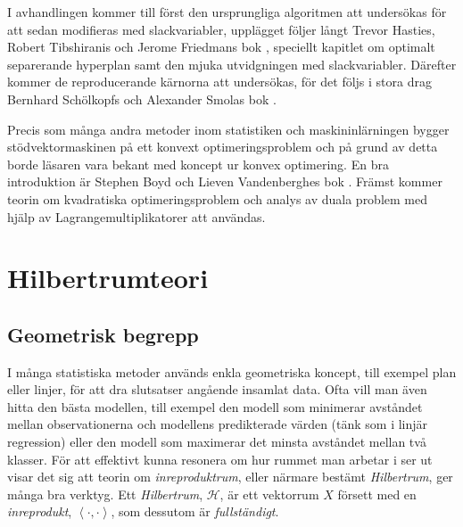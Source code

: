 \documentclass[a4paper, 12pt]{report}
\theoremstyle{definition}
\theoremstyle{remark}
\newcommand{\llangle}{\left\langle}
\newcommand{\rrangle}{\right\rangle}
\begin{document}
I avhandlingen kommer till först den ursprungliga algoritmen att undersökas för att sedan modifieras med slackvariabler, upplägget följer långt Trevor Hasties, Robert Tibshiranis och Jerome Friedmans bok \cite{ESL}, speciellt kapitlet om optimalt separerande hyperplan samt den mjuka utvidgningen med slackvariabler.
Därefter kommer de reproducerande kärnorna att undersökas, för det följs i stora drag Bernhard Schölkopfs och Alexander Smolas bok \cite{LearningKernels}.

Precis som många andra metoder inom statistiken och maskininlärningen bygger stödvektormaskinen på ett konvext optimeringsproblem och på grund av detta borde läsaren vara bekant med koncept ur konvex optimering.
En bra introduktion är Stephen Boyd och Lieven Vandenberghes bok \cite{Boyd}.
Främst kommer teorin om kvadratiska optimeringsproblem och analys av duala problem med hjälp av Lagrangemultiplikatorer att användas.


\chapter{Hilbertrumteori}\label{chap:hilbert}

\section{Geometrisk begrepp}
I många statistiska metoder används enkla geometriska koncept, till exempel plan eller linjer, för att dra slutsatser angående insamlat data.
Ofta vill man även hitta den bästa modellen, till exempel den modell som minimerar avståndet mellan observationerna och modellens predikterade värden (tänk som i linjär regression) eller den modell som maximerar det minsta avståndet mellan två klasser.
För att effektivt kunna resonera om hur rummet man arbetar i ser ut visar det sig att teorin om \emph{inreproduktrum}, eller närmare bestämt \emph{Hilbertrum}, ger många bra verktyg.
Ett \emph{Hilbertrum}, $\mathcal{H}$, är ett vektorrum $X$ försett med en \emph{inreprodukt}, $\llangle \cdot, \cdot\rrangle$, som dessutom är \emph{fullständigt}.
\end{document}
